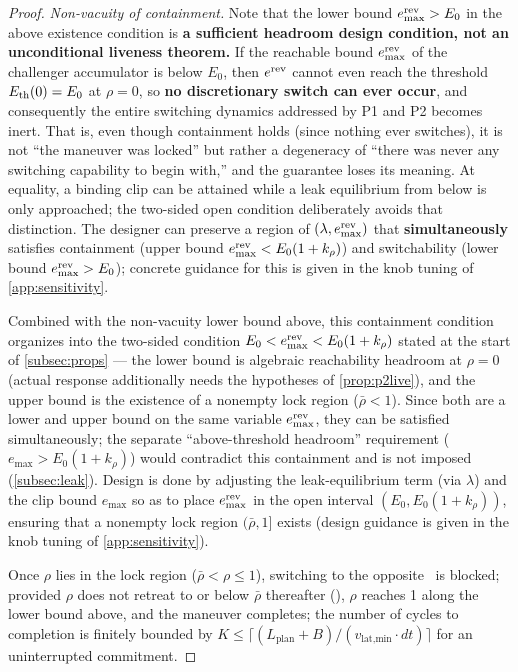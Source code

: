 \begin{proof}
\emph{Non-vacuity of containment.} Note that the lower bound $e^{\text{rev}}_{\max} > E_0$ in the above existence condition is \textbf{a sufficient headroom design condition, not an unconditional liveness theorem.} If the reachable bound $e^{\text{rev}}_{\max}$ of the challenger accumulator is below $E_0$, then $e^{\text{rev}}$ cannot even reach the threshold $E_{\text{th}}(0) = E_0$ at $\rho=0$, so \textbf{no discretionary switch can ever occur}, and consequently the entire switching dynamics addressed by P1 and P2 becomes inert. That is, even though containment holds (since nothing ever switches), it is not ``the maneuver was locked'' but rather a degeneracy of ``there was never any switching capability to begin with,'' and the guarantee loses its meaning. At equality, a binding clip can be attained while a leak equilibrium from below is only approached; the two-sided open condition deliberately avoids that distinction. The designer can preserve a region of $(\lambda, e^{\text{rev}}_{\max})$ that \textbf{simultaneously} satisfies containment (upper bound $e^{\text{rev}}_{\max} < E_0(1+k_\rho)$) and switchability (lower bound $e^{\text{rev}}_{\max} > E_0$); concrete guidance for this is given in the knob tuning of \cref{app:sensitivity}.

Combined with the non-vacuity lower bound above, this containment condition organizes into the two-sided condition $E_0 < e^{\text{rev}}_{\max} < E_0(1+k_\rho)$ stated at the start of \cref{subsec:props} --- the lower bound is algebraic reachability headroom at $\rho = 0$ (actual response additionally needs the hypotheses of \cref{prop:p2live}), and the upper bound is the existence of a nonempty lock region ($\bar\rho < 1$). Since both are a lower and upper bound on the same variable $e^{\text{rev}}_{\max}$, they can be satisfied simultaneously; the separate ``above-threshold headroom'' requirement ($e_{\max} > E_0(1+k_\rho)$) would contradict this containment and is not imposed (\cref{subsec:leak}). Design is done by adjusting the leak-equilibrium term (via $\lambda$) and the clip bound $e_{\max}$ so as to place $e^{\text{rev}}_{\max}$ in the open interval $(E_0, E_0(1+k_\rho))$, ensuring that a nonempty lock region $(\bar\rho, 1]$ exists (design guidance is given in the knob tuning of \cref{app:sensitivity}).

Once $\rho$ lies in the lock region ($\bar\rho < \rho \le 1$), switching to the opposite \Class\ is blocked; provided $\rho$ does not retreat to or below $\bar\rho$ thereafter (), $\rho$ reaches 1 along the lower bound above, and the maneuver completes; the number of cycles to completion is finitely bounded by $K \le \lceil(L_{\text{plan}}+B)/(v_{\text{lat,min}} \cdot dt)\rceil$ for an uninterrupted commitment.
\end{proof}


